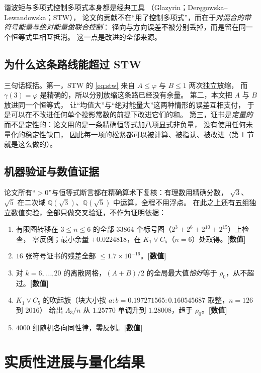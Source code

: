 \documentclass[UTF8,11pt]{ctexart}
\newcommand{\Lam}{\Lambda}
\newcommand{\num}{\textcolor[rgb]{0.55,0.35,0.00}{\bfseries [数值]}}
\begin{document}
谐波矩与多项式控制多项式本身都是经典工具
（Glazyrin；Der\k{e}gowska--Lewandowska；STW），
论文的贡献不在``用了控制多项式''，而在于\emph{对混合的带符号能量与绝对能量做联合控制}：
径向与方向误差不被分别丢掉，而是留在同一个恒等式里相互抵消。
这一点是改进的全部来源。

\subsection{为什么这条路线能超过 STW}

三句话概括。第一，STW 的 \eqref{eq:stw} 来自 $A\le\varphi$ 与 $B\le1$ 两次独立放缩，
而 $\gamma(3)=\varphi$ 是精确的，所以分别放缩这条路已经没有余量。
第二，本文把 $A$ 与 $B$ 放进同一个恒等式，
让``均值大''与``绝对能量大''这两种情形的误差互相支付，
于是可以在不改进任何单个投影常数的前提下改进它们的和。
第三，证书是\emph{定量的}而不是定性的：论文用的是一条精确恒等式加八项显式非负量，
没有使用任何未量化的稳定性缺口，
因此每一项的松紧都可以被计算、被指认、被改进（第 \ref{sec:slack} 节就是这么做的）。

\subsection{机器验证与数值证据}\label{sec:num}

论文所有``$>0$''与恒等式断言都在精确算术下复核：有理数用精确分数，
$\sqrt3$、$\sqrt5$ 在二次域 $\mathbb Q(\sqrt3)$、$\mathbb Q(\sqrt5)$ 中运算，全程不用浮点。
在此之上还有五组独立数值实验，全部只做交叉验证，不作为证明依据：
\begin{enumerate}[leftmargin=2em,itemsep=2pt]
\item 有限图转移在 $3\le n\le6$ 的全部 $33864$ 个标号图（$2^3+2^6+2^{10}+2^{15}$）上检查，
零反例；最小余量 $+0.0224818$，在 $K_1\vee C_5$（$n=6$）处取得。\num
\item $16$ 张符号证书的残差全部 $\le1.7\times10^{-16}$。\num
\item 对 $k=6,\ldots,20$ 的离散网格，$(A+B)/2$ 的全局最大值\emph{恰好}等于 $\rho_0$，从不超过。\num
\item $K_1\vee C_5$ 的吹起族（块大小按 $a:b=0.197271565:0.160545687$ 取整，$n=126$ 到 $2016$）
给出 $\Lam_3/n$ 从 $1.25770$ 单调升到 $1.28008$，趋于 $\rho_0$。\num
\item $4000$ 组随机各向同性律，零反例。\num
\end{enumerate}

\section{实质性进展与量化结果}\label{sec:slack}
\end{document}
